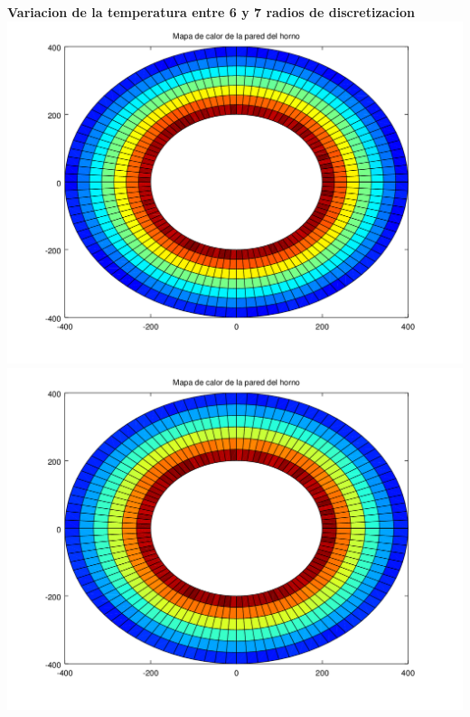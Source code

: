 \begin{enumerate}
  	\textbf{Variacion de la temperatura entre 6 y 7 radios de discretizacion}\\
	\includegraphics[scale=0.35]{experimentos1a_1b/evolucion_posicion_isoterma_temperatura/test2/test6_006_radios_inst_001_heatmap.png}
	\includegraphics[scale=0.35]{experimentos1a_1b/evolucion_posicion_isoterma_temperatura/test2/test6_007_radios_inst_001_heatmap.png}


\end{enumerate}
